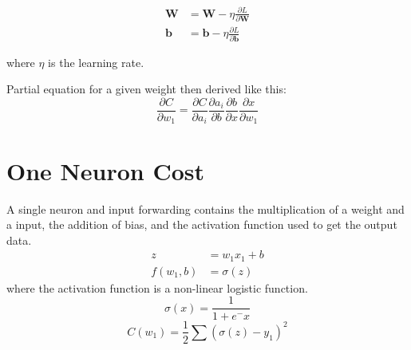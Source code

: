 \documentclass{article}
\begin{document}
\begin{align*}
    \mathbf{W} &= \mathbf{W} - \eta \frac{\partial L}{\partial \mathbf{W}} \\
    \mathbf{b} &= \mathbf{b} - \eta \frac{\partial L}{\partial \mathbf{b}}
\end{align*}

where $\eta$ is the learning rate.

Partial equation for a given weight then derived like this:
\begin{equation*}
  \frac{\partial C}{\partial {w_1}} = \frac{\partial C}{\partial {a_i}} \frac{\partial {a_i}}{\partial b} \frac{\partial b}{\partial x} \frac{\partial x}{\partial {w_1}}
\end{equation*}
\section{One Neuron Cost}
A single neuron and input forwarding contains the multiplication of a weight and a input, the addition of bias, and the activation function used to get the output data.
\begin{align}
  z         &= w_1 x_1 + b \\
  f(w_1, b) &= \sigma(z)
\end{align}
where the activation function is a non-linear logistic function.
\begin{equation}
\sigma(x) = \frac{1}{1+{e^-x}}
\end{equation}
\begin{equation}
C(w_1) = \frac{1}{2}\displaystyle\sum \left(\sigma(z) - y_1 \right)^2
\end{equation}
\end{document}
